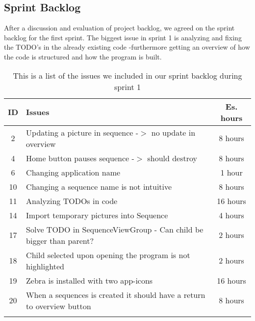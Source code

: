 \subsection{Sprint Backlog}\label{subsec:spr1_sprblog}
After a discussion and evaluation of project backlog, we agreed on the sprint backlog for the first sprint. The biggest issue in sprint 1 is analyzing and fixing the TODO's in the already existing code -furthermore getting an overview of how the code is structured and how the program is built.
\begin{longtable} { | c | p{12cm} | c | } 
\hline
	ID 	&	Issues	&		 Es. hours \\\hline
	2	& 	Updating a picture in sequence -$>$ no update in overview	&	8 hours	\\\hline
	4	& 	Home button pauses sequence -$>$ should destroy	&	8 hours	\\\hline
	6	& 	Changing application name	&	1 hour	\\\hline
	10	& 	Changing a sequence name is not intuitive	&	8 hours	\\\hline
	11	& 	Analyzing TODOs in code	&	16 hours	\\\hline
	14	& 	Import temporary pictures into Sequence	&	4 hours	\\\hline
	17	& 	Solve TODO in SequenceViewGroup - Can child be bigger than parent?	&	2 hours	\\\hline
	18	& 	Child selected upon opening the program is not highlighted	&	2 hours	\\\hline
	19	& 	Zebra is installed with two app-icons	&	16 hours	\\\hline
	20	& 	When a sequences is created it should have a return to overview button	&	8 hours	\\\hline
\caption{This is a list of the issues we included in our sprint backlog during sprint 1}
\label{tab:spr1_sprintblog}
\end{longtable}